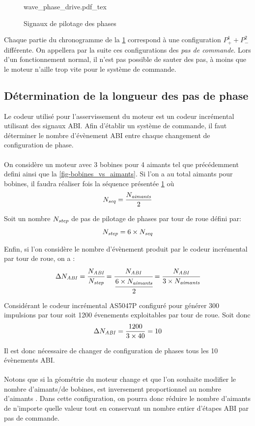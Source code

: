 \begin{figure}[h]
    \centering
    {wave_phase_drive.pdf_tex}
    \caption{Signaux de pilotage des phases}
    \label{fig-wave_phase_drive}
\end{figure}

Chaque partie du chronogramme de la \cref{fig-wave_phase_drive} correspond à une configuration $P^1_+ + P^2_-$ différente.
On appellera par la suite ces configurations des \emph{pas de commande}.
Lors d'un fonctionnement normal, il n'est pas possible de sauter des pas, à moins que le moteur n'aille trop vite pour le système de commande.  

\subsection{Détermination de la longueur des pas de phase}
Le codeur utilisé pour l'asservissement du moteur est un codeur incrémental utilisant des signaux ABI.
Afin d'établir un système de commande, il faut déterminer \dnabi le nombre d'évènement ABI entre chaque changement de configuration de phase.

\paragraph{}
On considère un moteur avec 3 bobines pour 4 aimants tel que précédemment defini ainsi que la \cref{fig-bobines_vs_aimants}.
Si l'on a au total \naimants aimants pour \nbobines bobines, il faudra réaliser \nseq fois la séquence présentée \cref{fig-wave_phase_drive} où
$$N_\mathit{seq} = \frac{N_\mathit{aimants}}{2}$$

Soit un nombre $N_\mathit{step}$ de pas de pilotage de phases par tour de roue défini par:
$$N_\mathit{step} = 6 \times N_\mathit{seq}$$

Enfin, si l'on considère \nabi le nombre d'évènement produit par le codeur incrémental par tour de roue, on a :
$$\Delta N_\mathit{ABI} = \cfrac{N_\mathit{ABI}}{N_\mathit{step}} = \cfrac{N_\mathit{ABI}}{\cfrac{6\times N_\mathit{aimants}}{2}} = \cfrac{N_\mathit{ABI}}{3\times N_\mathit{aimants}}$$

Considérant le codeur incrémental AS5047P configuré pour générer 300 impulsions par tour soit 1200 évenements exploitables par tour de roue.
Soit donc 
$$\Delta N_\mathit{ABI} = \frac{1200}{3\times40} = 10$$

Il est donc nécessaire de changer de configuration de phases tous les 10 évènements ABI.

\paragraph{}
Notons que si la géométrie du moteur change et que l'on souhaite modifier le nombre d'aimants/de bobines, \dnabi est inversement proportionnel au nombre d'aimants \naimants.
Dans cette configuration, on pourra donc réduire le nombre d'aimants de n'importe quelle valeur tout en conservant un nombre entier d'étapes ABI par pas de commande.

